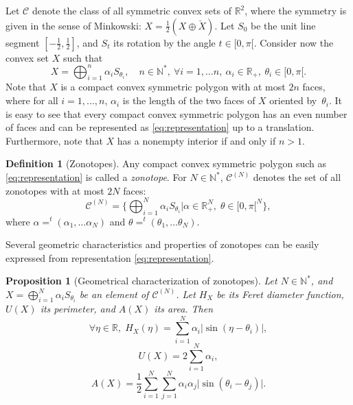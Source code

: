 \documentclass[numbers,compress,v1.0.1]{vmsta}
\newtheorem{proposition}{Proposition}
\theoremstyle{definition}
\newtheorem{definition}{Definition}
\begin{document}
Let $\mathcal{C}$ denote the class of all symmetric convex sets of
$\mathbb{R}^2$, where the symmetry is given in the sense of Minkowski:
$X=\frac{1}{2}(X\oplus\breve{X})$.
Let $S_0$ be the unit line segment $[-\frac{1}{2},\frac{1}{2}]$, and
$S_t$ its rotation by the angle $t\in[0,\pi[$. Consider now the convex
set $X$ such that
%
\begin{equation}
X=\bigoplus_{i=1}^n \alpha_i
S_{\theta_i}, \quad n\in\mathbb{N}^*, \ \forall i=1,\ldots n, \
\alpha_i\in\mathbb{R}_+, \ \theta_i\in[0,\pi[.
\label{eq:representation}
\end{equation}
%
Note that $X$ is a compact convex symmetric polygon with at most $2n$
faces, where for all $i=1,\dots,n$, $\alpha_i$ is the length of the
two faces of $X$ oriented by~$\theta_i$. It is easy to see that every
compact convex symmetric polygon has an even number of faces and can be
represented as \eqref{eq:representation} up to a translation.
Furthermore, note that $X$ has a nonempty interior if and only if $n>1$.

\begin{definition}[Zonotopes]
Any compact convex symmetric polygon such as \eqref{eq:representation}
is called a \textit{zonotope}. For $N\in\mathbb{N}^*$, $\mathcal
{C}^{(N)}$ denotes the set of all zonotopes with at most $2N$ faces:
%
\begin{equation*}
\mathcal{C}^{(N)}=\Biggl\lbrace\bigoplus_{i=1}^N
\alpha_i S_{\theta_i}\big\vert \alpha\in\mathbb{R}_+ ^N,
\; \theta\in[0,\pi[^N\Biggr\rbrace,
\end{equation*}
%
where $\alpha=^t(\alpha_1,\ldots\alpha_N)$ and $\theta=^t(\theta
_1,\ldots\theta_N)$.
\end{definition}
%
Several geometric characteristics and properties of zonotopes can be
easily expressed from representation \eqref{eq:representation}.

\begin{proposition}[Geometrical characterization of zonotopes]
Let $N\in\mathbb{N}^*$, and $X=\bigoplus_{i=1}^N \alpha_i S_{\theta_i}
$ be an element of $\mathcal{C}^{(N)}$. Let $H_X$ be its Feret diameter
function, $U(X)$ its perimeter, and $A(X)$ its area. Then
%
\begin{equation}
\forall\eta\in\mathbb{R},\; H_X(\eta)=\sum
_{i=1}^N \alpha_i\bigl\vert\sin (\eta-
\theta_i)\bigr\vert, \label{eq:ferretPolygone}
\end{equation}
%
\begin{equation}
U(X)=2\sum_{i=1}^N \alpha_i,
\label{eq:PerimPolygone}
\end{equation}
%
\begin{equation}
A(X)=\frac{1}{2}\sum_{i=1}^N \sum
_{j=1}^N\alpha_i
\alpha_j\bigl\vert\sin (\theta_i-\theta_j)\bigr\vert.
\label{eq:airPolygone}
\end{equation}

\label{prop:A P H deterministe}
\end{proposition}
\end{document}
